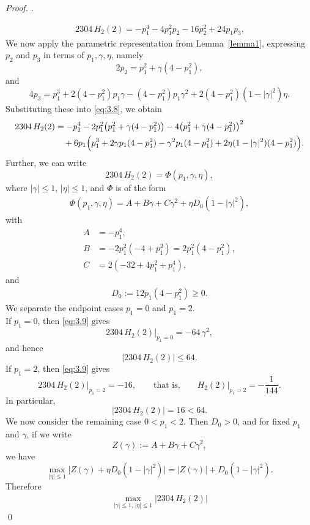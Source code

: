 \documentclass[a4paper,12pt,reqno]{amsart} %
\numberwithin{equation}{section}
\theoremstyle{definition}
\newenvironment{pf}[1][]{%
	\vskip 3mm
	\noindent
	\ifthenelse{\equal{#1}{}}%
	{{\slshape Proof. }}%
	{{\slshape #1.} }%
}%
{\qed\bigskip}
\begin{document}
\begin{pf}
\begin{align}\label{eq:3.8}
2304\,H_2(2)
=
-p_1^4-4p_1^2p_2-16p_2^2+24p_1p_3.
\end{align}
We now apply the parametric representation from Lemma~\ref{lemma1}, expressing $p_2$ and $p_3$ in terms of $p_1,\gamma,\eta$, namely
\[
2p_2=p_1^2+\gamma(4-p_1^2),
\]
and
\[
4p_3
=
p_1^3
+2(4-p_1^2)p_1\gamma
-(4-p_1^2)p_1\gamma^2
+2(4-p_1^2)(1-|\gamma|^2)\eta.
\]
Substituting these into \eqref{eq:3.8}, we obtain
\begin{align}\label{eq:3.9}
2304\,H_2(2)
&=
-p_1^4
-2p_1^2\bigl(p_1^2+\gamma(4-p_1^2)\bigr)
-4\bigl(p_1^2+\gamma(4-p_1^2)\bigr)^2 \notag\\
&\quad
+6p_1\Bigl(
p_1^3
+2\gamma p_1(4-p_1^2)
-\gamma^2 p_1(4-p_1^2)
+2\eta(1-|\gamma|^2)(4-p_1^2)
\Bigr).
\end{align}
Further, we can write
\[
2304\,H_2(2)=\Phi(p_1,\gamma,\eta),
\]
where $|\gamma|\le 1$, $|\eta|\le 1$, and $\Phi$ is of the form
\begin{align}\label{eq:3.10}
\Phi(p_1,\gamma,\eta)
=
A+B\gamma+C\gamma^2+\eta D_0(1-|\gamma|^2),
\end{align}
with
\begin{align*}
A&=-p_1^4,\\[4pt]
B&=-2p_1^2(-4+p_1^2)=2p_1^2(4-p_1^2),\\[4pt]
C&=2(-32+4p_1^2+p_1^4),
\end{align*}
and
\begin{align}\label{eq:3.11}
D_0:=12p_1(4-p_1^2)\ge 0.
\end{align}
We separate the endpoint cases $p_1=0$ and $p_1=2$.\\[2mm]
If $p_1=0$, then \eqref{eq:3.9} gives
\[
2304\,H_2(2)\big|_{p_1=0}=-64\,\gamma^2,
\]
and hence
\begin{equation}\label{eq:3.12}
|2304\,H_2(2)|\le 64.
\end{equation}
If $p_1=2$, then \eqref{eq:3.9} gives
\[
2304\,H_2(2)\big|_{p_1=2}=-16,
\qquad\text{that is,}\qquad
H_2(2)\big|_{p_1=2}=-\frac{1}{144}.
\]
In particular,
\begin{equation}\label{eq:3.13}
|2304\,H_2(2)|=16<64.
\end{equation}
We now consider the remaining case
$
0<p_1<2.
$
Then $D_0>0$, and for fixed $p_1$ and $\gamma$, if we write
\[
Z(\gamma):=A+B\gamma+C\gamma^2,
\]
we have
\[
\max_{|\eta|\le 1}\bigl|Z(\gamma)+\eta D_0(1-|\gamma|^2)\bigr|
=
|Z(\gamma)|+D_0(1-|\gamma|^2).
\]
Therefore
\begin{align}\label{eq:3.14}
\max_{|\gamma|\le 1,\,|\eta|\le 1}|2304\,H_2(2)|

\end{align}
\end{pf}
\end{document}
